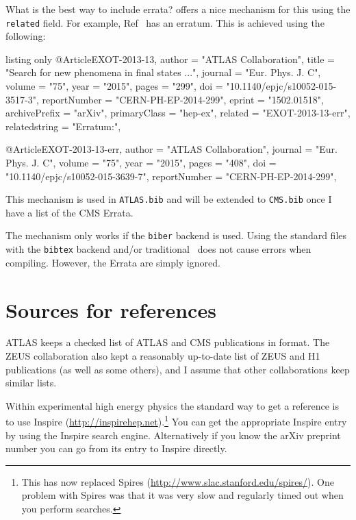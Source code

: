 What is the best way to include errata?
 offers a nice mechanism for this using the \texttt{related} field.
For example, Ref~\cite{EXOT-2013-13} has an erratum.
This is achieved using the following:
\begin{tcblisting}{listing only}
@Article{EXOT-2013-13,
    author         = "{ATLAS Collaboration}",
    title          = "{Search for new phenomena in final states ...}",
    journal        = "Eur. Phys. J. C",
    volume         = "75",
    year           = "2015",
    pages          = "299",
    doi            = "10.1140/epjc/s10052-015-3517-3",
    reportNumber   = "CERN-PH-EP-2014-299",
    eprint         = "1502.01518",
    archivePrefix  = "arXiv",
    primaryClass   = "hep-ex",
    related        = "EXOT-2013-13-err",
    relatedstring  = "Erratum:",
}

@Article{EXOT-2013-13-err,
    author         = "{ATLAS Collaboration}",
    journal        = "Eur. Phys. J. C",
    volume         = "75",
    year           = "2015",
    pages          = "408",
    doi            = "10.1140/epjc/s10052-015-3639-7",
    reportNumber   = "CERN-PH-EP-2014-299",
}
\end{tcblisting}

This mechanism is used in \texttt{ATLAS.bib} and will be extended to \texttt{CMS.bib} once
I have a list of the CMS Errata.

The mechanism only works if the \texttt{biber} backend is used.
Using the standard files with the \texttt{bibtex} backend and/or traditional \BibTeX\ does not cause errors when compiling.
However, the Errata are simply ignored.


\section{Sources for references}%
\label{sec:ref:sources}

ATLAS keeps a checked list of ATLAS and CMS publications in \BibTeX{} format. 
The ZEUS collaboration also kept a reasonably up-to-date list of ZEUS and
H1 publications (as well as some others),
and I assume that other collaborations keep similar lists.

Within experimental high energy physics the standard way to get a
reference is to use Inspire
(\url{http://inspirehep.net}).\footnote{This has now replaced Spires
(\url{http://www.slac.stanford.edu/spires/}).
One problem with Spires was that it was very slow and regularly
timed out when you perform searches.} You can get the appropriate
Inspire entry by using the Inspire search engine. Alternatively if you
know the arXiv preprint number you can go from its entry to Inspire
directly.

